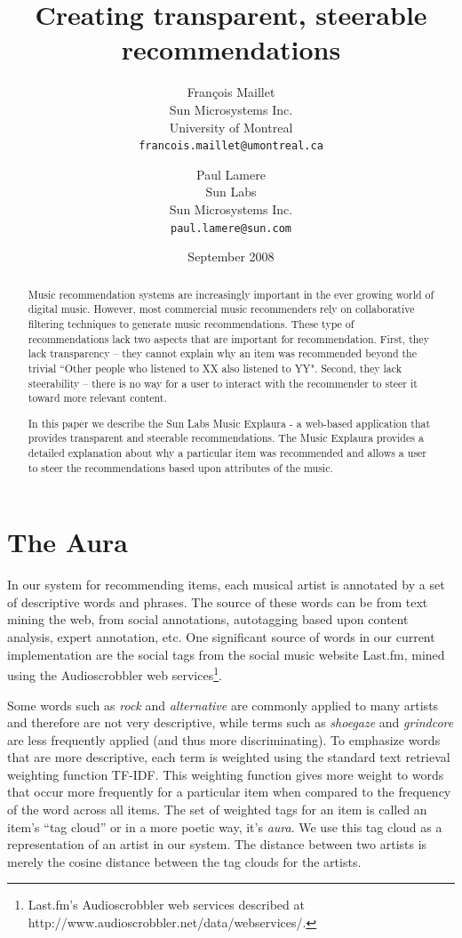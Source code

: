 \documentclass{article}
\title{Creating transparent, steerable recommendations}
\author{
Fran\c{c}ois Maillet\\
Sun Microsystems Inc.\\
University of Montreal\\
\texttt{francois.maillet@umontreal.ca}
\and 
Paul Lamere \\
Sun Labs\\
Sun Microsystems Inc.\\
\texttt{paul.lamere@sun.com}
}
\date{September 2008}
\begin{document}
\maketitle

\begin{abstract}

Music recommendation systems are increasingly important in the ever 
    growing world of digital music.  However, most commercial music 
    recommenders rely on collaborative filtering techniques to generate 
    music recommendations. These type of recommendations lack two aspects 
    that are important for recommendation.  First, they lack transparency 
    -- they cannot explain why an item was recommended beyond the trivial 
    ``Other people who listened to XX also listened to YY". Second, they 
    lack steerability -- there is no way for a user to interact with the 
    recommender to steer it toward more relevant content.
    
    In this paper we describe the Sun Labs Music Explaura - a 
    web-based application that provides transparent and steerable 
    recommendations. The Music Explaura provides a detailed explanation 
    about why a particular item was recommended and allows a user to 
    steer the recommendations based upon attributes of the music.

\end{abstract}

\section{The Aura}

In our system for recommending items, each musical artist is annotated
by a set of descriptive words and phrases.  The source
of these words can be from text mining the web, from social
annotations, autotagging based upon content analysis, expert
annotation, etc.  One significant source of words in our current
implementation are the social tags from the social music website
Last.fm, mined using the Audioscrobbler web services\footnote{Last.fm's
Audioscrobbler web services described at
http://www.audioscrobbler.net/data/webservices/.}.

Some words such as \textit{rock} and \textit{alternative} are
commonly applied to many artists and therefore are not very descriptive,
while terms such as \textit{shoegaze} and \textit{grindcore} are
less frequently applied (and thus more discriminating).  To emphasize
words that are more descriptive, each term is weighted using the
standard text retrieval weighting function TF-IDF. This
weighting function gives more weight to words that occur more
frequently for a particular item when compared to the frequency of
the word across all items.  The set of weighted tags for an item
is called an item's ``tag cloud'' or in a more poetic way, it's
\textit{aura}.  We use this tag cloud as a representation of
an artist in our system. The distance between two artists is merely
the cosine distance between the tag clouds for the artists.
\end{document}

